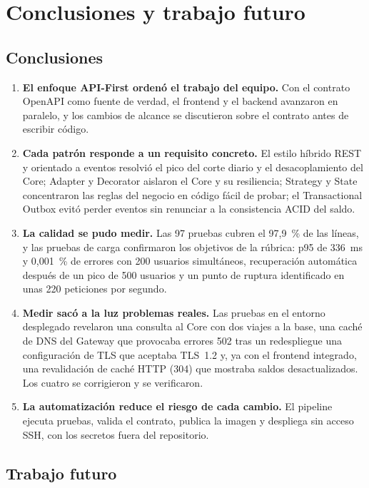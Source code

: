 \chapter{Conclusiones y trabajo futuro}\label{cap:conclusiones}

\section{Conclusiones}

\begin{enumerate}
  \item \textbf{El enfoque API-First ordenó el trabajo del equipo.} Con el contrato OpenAPI como fuente de verdad, el frontend y el backend avanzaron en paralelo, y los cambios de alcance se discutieron sobre el contrato antes de escribir código.
  \item \textbf{Cada patrón responde a un requisito concreto.} El estilo híbrido REST y orientado a eventos resolvió el pico del corte diario y el desacoplamiento del Core; Adapter y Decorator aislaron el Core y su resiliencia; Strategy y State concentraron las reglas del negocio en código fácil de probar; el Transactional Outbox evitó perder eventos sin renunciar a la consistencia ACID del saldo.
  \item \textbf{La calidad se pudo medir.} Las 97 pruebas cubren el 97,9~\% de las líneas, y las pruebas de carga confirmaron los objetivos de la rúbrica: p95 de 336~ms y 0,001~\% de errores con 200 usuarios simultáneos, recuperación automática después de un pico de 500 usuarios y un punto de ruptura identificado en unas 220 peticiones por segundo.
  \item \textbf{Medir sacó a la luz problemas reales.} Las pruebas en el entorno desplegado revelaron una consulta al Core con dos viajes a la base, una caché de DNS del Gateway que provocaba errores 502 tras un redespliegue una configuración de TLS que aceptaba TLS~1.2 y, ya con el frontend integrado, una revalidación de caché HTTP (304) que mostraba saldos desactualizados. Los cuatro se corrigieron y se verificaron.
  \item \textbf{La automatización reduce el riesgo de cada cambio.} El pipeline ejecuta pruebas, valida el contrato, publica la imagen y despliega sin acceso SSH, con los secretos fuera del repositorio.
\end{enumerate}

\section{Trabajo futuro}

